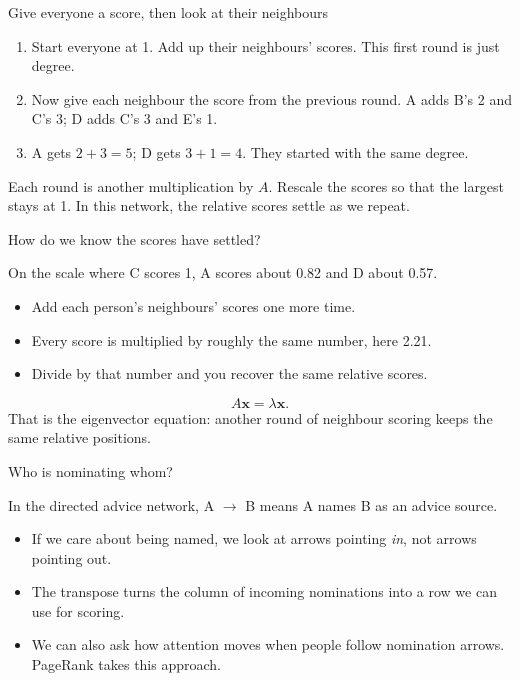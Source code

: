 \documentclass[aspectratio=169,11pt]{beamer}
\begin{document}
\begin{frame}{Give everyone a score, then look at their neighbours}

\begin{enumerate}
\item Start everyone at 1. Add up their neighbours' scores. This first round is just degree.
\medskip\item Now give each neighbour the score from the previous round. A adds B's 2 and C's 3; D adds C's 3 and E's 1.
\medskip\item A gets $2+3=5$; D gets $3+1=4$. They started with the same degree.
\end{enumerate}
Each round is another multiplication by $A$. Rescale the scores so that the largest stays at 1. In this network, the relative scores settle as we repeat.

\end{frame}

\begin{frame}{How do we know the scores have settled?}

On the scale where C scores 1, A scores about 0.82 and D about 0.57.
\begin{itemize}
\item Add each person's neighbours' scores one more time.
\medskip\item Every score is multiplied by roughly the same number, here 2.21.
\medskip\item Divide by that number and you recover the same relative scores.
\end{itemize}
\[A\mathbf{x}=\lambda\mathbf{x}.\]
That is the eigenvector equation: another round of neighbour scoring keeps the same relative positions.

\end{frame}

\begin{frame}{Who is nominating whom?}

In the directed advice network, A $\to$ B means A names B as an advice source.
\begin{itemize}
\item If we care about being named, we look at arrows pointing \emph{in}, not arrows pointing out.
\medskip\item The transpose turns the column of incoming nominations into a row we can use for scoring.
\medskip\item We can also ask how attention moves when people follow nomination arrows. PageRank takes this approach.
\end{itemize}

\end{frame}
\end{document}
